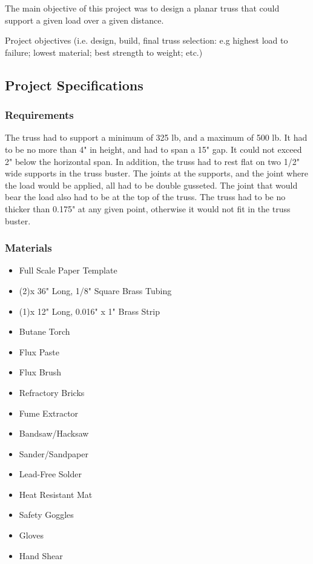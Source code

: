 \documentclass{article}
\let\Oldsubsection\subsection
\renewcommand{\subsection}{\FloatBarrier\Oldsubsection}
\let\Oldsubsubsection\subsubsection
\renewcommand{\subsubsection}{\FloatBarrier\Oldsubsubsection}
\begin{document}
  The main objective of this project was to design a planar truss that could support a given load over a given distance.
  
  Project objectives (i.e. design, build, final truss selection: e.g highest load to failure; lowest material; best strength to weight; etc.)
  
  \subsection{Project Specifications}
  
  \subsubsection{Requirements}
  
  The truss had to support a minimum of 325 lb, and a maximum of 500 lb. It had to be no more than 4" in height, and had to span a 15" gap. It could not exceed 2" below the horizontal span. In addition, the truss had to rest flat on two 1/2" wide supports in the truss buster. The joints at the supports, and the joint where the load would be applied, all had to be double gusseted. The joint that would bear the load also had to be at the top of the truss. The truss had to be no thicker than 0.175" at any given point, otherwise it would not fit in the truss buster. 
  
  \subsubsection{Materials}
  \begin{itemize}
  \item Full Scale Paper Template
  \item (2)x 36" Long, 1/8" Square Brass Tubing
  \item (1)x 12" Long, 0.016" x 1" Brass Strip
  \item Butane Torch
  \item Flux Paste
  \item Flux Brush
  \item Refractory Bricks
  \item Fume Extractor
  \item Bandsaw/Hacksaw
  \item Sander/Sandpaper
  \item Lead-Free Solder
  \item Heat Resistant Mat
  \item Safety Goggles
  \item Gloves
  \item Hand Shear
  \end{itemize}
  
\end{document}
